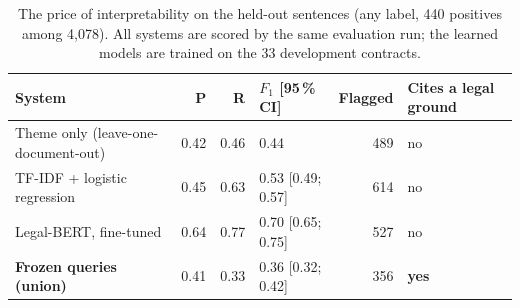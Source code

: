 \begin{table}[t]
\caption{The price of interpretability on the held-out sentences (any \corpus{} label, 440 positives among 4,078). All systems are scored by the same evaluation run; the learned models are trained on the 33 development contracts.}
\label{tab:cost}
\centering
\footnotesize\setlength{\tabcolsep}{4pt}%
\begin{tabular}{@{}lrrlrl@{}}
\toprule
System & P & R & $F_1$ [95\,\% CI] & Flagged & Cites a legal ground \\
\midrule
Theme only (leave-one-document-out) & 0.42 & 0.46 & 0.44 & 489 & no \\
TF-IDF + logistic regression & 0.45 & 0.63 & 0.53 [0.49; 0.57] & 614 & no \\
Legal-BERT, fine-tuned & 0.64 & 0.77 & 0.70 [0.65; 0.75] & 527 & no \\
\textbf{Frozen queries (union)} & 0.41 & 0.33 & 0.36 [0.32; 0.42] & 356 & \textbf{yes} \\
\bottomrule
\end{tabular}
\end{table}
